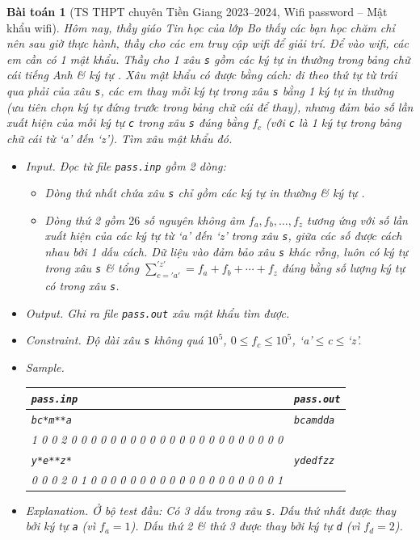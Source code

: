 \documentclass{article}
\newtheorem{baitoan}{Bài toán}
\begin{document}
\begin{baitoan}[TS THPT chuyên Tiền Giang 2023--2024, Wifi password -- Mật khẩu wifi]
	Hôm nay, thầy giáo Tin học của lớp Bo thấy các bạn học chăm chỉ nên sau giờ thực hành, thầy cho các em truy cập wifi để giải trí. Để vào wifi, các em cần có 1 mật khẩu. Thầy cho 1 xâu {\tt s} gồm các ký tự in thường trong bảng chữ cái tiếng Anh \& ký tự {\tt*}. Xâu mật khẩu có được bằng cách: đi theo thứ tự từ trái qua phải của xâu {\tt s}, các em thay mỗi ký tự {\tt*} trong xâu {\tt s} bằng 1 ký tự in thường (ưu tiên chọn ký tự đứng trước trong bảng chữ cái để thay), nhưng đảm bảo số lần xuất hiện của mỗi ký tự {\tt c} trong xâu {\tt s} đúng bằng $f_c$ (với {\tt c} là 1 ký tự trong bảng chữ cái từ `a' đến `z'). Tìm xâu mật khẩu đó.
	\begin{itemize}
		\item {\sf Input.} Đọc từ file {\tt pass.inp} gồm 2 dòng:
		\begin{itemize}
			\item Dòng thứ nhất chứa xâu {\tt s} chỉ gồm các ký tự in thường \& ký tự {\tt*}.
			\item Dòng thứ 2 gồm $26$ số nguyên không âm $f_a,f_b,\ldots,f_z$ tương ứng với số lần xuất hiện của các ký tự từ `a' đến `z' trong xâu {\tt s}, giữa các số được cách nhau bởi 1 dấu cách. Dữ liệu vào đảm bảo xâu {\tt s} khác rỗng, luôn có ký tự {\tt*} trong xâu {\tt s} \& tổng $\sum_{c='a'}^{'z'} = f_a + f_b + \cdots + f_z$ đúng bằng số lượng ký tự {\tt*} có trong xâu {\tt s}.
		\end{itemize}
		\item {\sf Output.} Ghi ra file {\tt pass.out} xâu mật khẩu tìm được.
		\item {\sf Constraint.} Độ dài xâu {\tt s} không quá $10^5$, $0\le f_c\le10^5$, `a'$\le$c$\le$`z'.
		\item {\sf Sample.}
		\begin{table}[H]
			\centering
			\begin{tabular}{|l|l|}
				\hline
				\texttt{pass.inp} & \texttt{pass.out} \\
				\hline
				\texttt{bc*m**a} & \texttt{bcamdda} \\
				1 0 0 2 0 0 0 0 0 0 0 0 0 0 0 0 0 0 0 0 0 0 0 0 0 0 & \\
				\hline
				\texttt{y*e**z*} & \texttt{ydedfzz} \\
				0 0 0 2 0 1 0 0 0 0 0 0 0 0 0 0 0 0 0 0 0 0 0 0 0 1 & \\
				\hline
			\end{tabular}
		\end{table}
		\item {\sf Explanation.} Ở bộ test đầu: Có 3 dấu {\tt*} trong xâu {\tt s}. Dấu {\tt*} thứ nhất được thay bởi ký tự {\tt a} (vì $f_a = 1$). Dấu {\tt*}  thứ 2 \& thứ 3 được thay bởi ký tự {\tt d} (vì $f_d = 2$).
	\end{itemize}
\end{baitoan}
\end{document}
